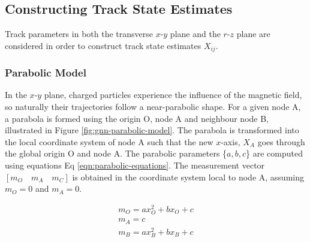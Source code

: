 



\subsection{Constructing Track State Estimates}
\label{constructing-track-states}

Track parameters in both the transverse $x$-$y$ plane and the $r$-$z$ plane are considered in order to construct track state estimates $X_{ij}$.

\subsubsection{Parabolic Model}
\label{parabolic-state}

In the $x$-$y$ plane, charged particles experience the influence of the magnetic field, so naturally their trajectories follow a near-parabolic shape. For a given node A, a parabola is formed using the origin O, node A and neighbour node B, illustrated in Figure \ref{fig:gnn-parabolic-model}. The parabola is transformed into the local coordinate system of node A such that the new $x$-axis, $X_A$ goes through the global origin O and node A. The parabolic parameters \{$a, b, c$\} are computed using equations Eq \eqref{eqn:parabolic-equations}. The measurement vector $[m_O \quad m_A \quad m_C]$ is obtained in the coordinate system local to node A, assuming $m_O = 0$ and $m_A = 0$.

\begin{equation}
\begin{aligned}
m_O = ax_{O}^{2} + bx_O + c \\
m_A = c \\
m_B = ax_{B}^{2} + bx_B + c
\end{aligned}
\label{eqn:parabolic-equations}
\end{equation}

